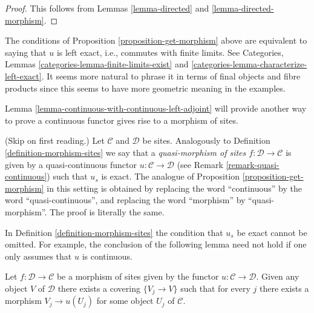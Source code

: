 \begin{proof}
This follows from Lemmas \ref{lemma-directed} and
\ref{lemma-directed-morphism}.
\end{proof}

\begin{remark}
\label{remark-explain-left-exact}
The conditions of Proposition \ref{proposition-get-morphism} above
are equivalent to saying that $u$ is left exact, i.e., commutes
with finite limits. See
Categories, Lemmas
\ref{categories-lemma-finite-limits-exist} and
\ref{categories-lemma-characterize-left-exact}.
It seems more natural to phrase it in terms of final objects
and fibre products since this seems to have more geometric meaning
in the examples.
\end{remark}

\noindent
Lemma \ref{lemma-continuous-with-continuous-left-adjoint} will
provide another way to prove a continuous functor
gives rise to a morphism of sites.

\begin{remark}
\label{remark-quasi-continuous-morphism-sites}
(Skip on first reading.)
Let $\mathcal{C}$ and $\mathcal{D}$ be sites. Analogously to
Definition \ref{definition-morphism-sites} we say that
a {\it quasi-morphism of sites $f : \mathcal{D} \to \mathcal{C}$}
is given by a quasi-continuous functor $u : \mathcal{C} \to \mathcal{D}$
(see Remark \ref{remark-quasi-continuous}) such that $u_s$ is exact.
The analogue of Proposition \ref{proposition-get-morphism} in this
setting is obtained by replacing the word ``continuous''
by the word ``quasi-continuous'', and replacing the word
``morphism'' by ``quasi-morphism''. The proof is literally the
same.
\end{remark}

\noindent
In Definition \ref{definition-morphism-sites} the condition that $u_s$
be exact cannot be omitted. For example, the conclusion of the following
lemma need not hold if one only assumes that $u$ is continuous.

\begin{lemma}
\label{lemma-morphism-of-sites-covering}
Let $f : \mathcal{D} \to \mathcal{C}$ be a morphism of sites given by the
functor $u : \mathcal{C} \to \mathcal{D}$. Given any object $V$ of
$\mathcal{D}$ there exists a covering $\{V_j \to V\}$ such that for every
$j$ there exists a morphism $V_j \to u(U_j)$ for some object $U_j$
of $\mathcal{C}$.
\end{lemma}

